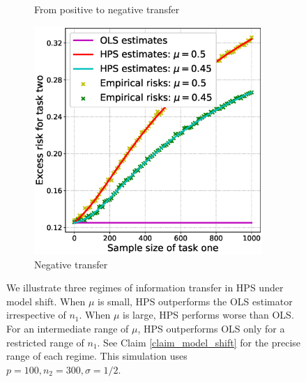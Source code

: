 \begin{figure}[!t]
\begin{subfigure}[b]{0.33\textwidth}
		\caption{From positive to negative transfer}
		\label{fig_sec3_model_transition}
	\end{subfigure}\hfill%
	\begin{subfigure}[b]{0.33\textwidth}
		\centering
		\includegraphics[width=0.95\textwidth]{figures/model_shift_negative.eps}
		\caption{Negative transfer}
		\label{fig_sec3_model_negative}
	\end{subfigure}	
	\caption{We illustrate three regimes of information transfer in HPS under model shift. When $\mu$ is small, HPS outperforms the OLS estimator irrespective of $n_1$. When $\mu$ is large, HPS performs worse than OLS. For an intermediate range of $\mu$, HPS outperforms OLS only for a restricted range of $n_1$. See Claim \ref{claim_model_shift} for the precise range of each regime. This simulation uses $p = 100, n_2 = 300, \sigma = 1/2$.}
	\label{fig_sec3_model_shift}
\end{figure}

